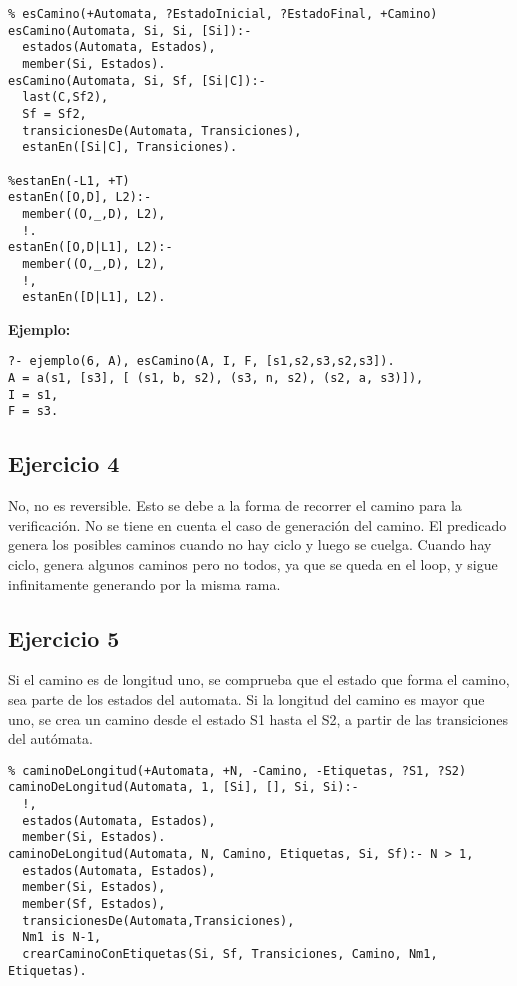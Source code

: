\documentclass[10pt, a4paper,english,spanish,hidelinks]{article}
\begin{document}
\begin{verbatim}
% esCamino(+Automata, ?EstadoInicial, ?EstadoFinal, +Camino)
esCamino(Automata, Si, Si, [Si]):-
  estados(Automata, Estados),
  member(Si, Estados).
esCamino(Automata, Si, Sf, [Si|C]):-
  last(C,Sf2),
  Sf = Sf2,
  transicionesDe(Automata, Transiciones),
  estanEn([Si|C], Transiciones).

%estanEn(-L1, +T)
estanEn([O,D], L2):-
  member((O,_,D), L2),
  !.
estanEn([O,D|L1], L2):-
  member((O,_,D), L2),
  !,
  estanEn([D|L1], L2).									
\end{verbatim}

\textbf{Ejemplo:}
\begin{verbatim}
?- ejemplo(6, A), esCamino(A, I, F, [s1,s2,s3,s2,s3]).
A = a(s1, [s3], [ (s1, b, s2), (s3, n, s2), (s2, a, s3)]),
I = s1,
F = s3.
\end{verbatim}


\subsection{Ejercicio 4}

No, no es reversible. 
Esto se debe a la forma de recorrer el camino para la verificación. No se tiene
en cuenta el caso de generación del camino.
El predicado genera los posibles caminos cuando no hay ciclo y luego se cuelga.
Cuando hay ciclo, genera algunos caminos pero no todos, ya que se queda en el loop,
y sigue infinitamente generando por la misma rama.


\subsection{Ejercicio 5}
Si el camino es de longitud uno, se comprueba que el estado que forma el camino, sea
parte de los estados del automata. Si la longitud del camino es mayor que uno, se crea
un camino desde el estado S1 hasta el S2, a partir de las transiciones del autómata.

\begin{verbatim}
% caminoDeLongitud(+Automata, +N, -Camino, -Etiquetas, ?S1, ?S2)
caminoDeLongitud(Automata, 1, [Si], [], Si, Si):-
  !,
  estados(Automata, Estados),
  member(Si, Estados).
caminoDeLongitud(Automata, N, Camino, Etiquetas, Si, Sf):- N > 1,
  estados(Automata, Estados),
  member(Si, Estados),
  member(Sf, Estados),
  transicionesDe(Automata,Transiciones),
  Nm1 is N-1,
  crearCaminoConEtiquetas(Si, Sf, Transiciones, Camino, Nm1, Etiquetas).
\end{verbatim}
\end{document}
